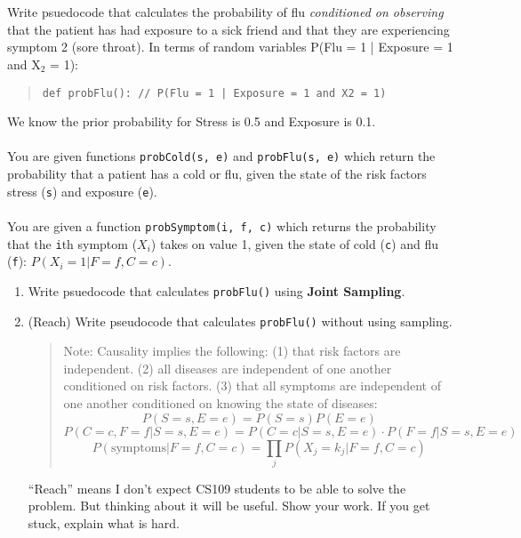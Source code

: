\documentclass[12pt]{article}
\renewcommand{\(}{\left(}
\renewcommand{\)}{\right)}
\theoremstyle{definition}
\begin{document}
\begin{enumerate}
{
    \\ \\
    Write psuedocode that calculates the probability of flu \textit{conditioned on observing} that the patient has had exposure to a sick friend and that they are experiencing symptom 2 (sore throat). In terms of random variables P(Flu = 1 | Exposure = 1 and X$_2$ = 1):
    \begin{quote}
        \texttt{def probFlu(): // P(Flu = 1 | Exposure = 1 and X2 = 1)}
    \end{quote}
    We know the prior probability for Stress is 0.5 and Exposure is 0.1.\\ \\
    You are given functions \texttt{probCold(s, e)} and \texttt{probFlu(s, e)} which return the probability that a patient has a cold or flu, given the state of the risk factors stress (\texttt{s}) and exposure (\texttt{e}).\\ \\
    You are given a function \texttt{probSymptom(i, f, c)} which returns the probability that the \texttt{i}th symptom ($X_i$) takes on value 1, given the state of cold (\texttt{c}) and flu (\texttt{f}): $P(X_i = 1|F = f,C = c)$.
    
    \begin{enumerate}
        \item Write psuedocode that calculates \texttt{probFlu()} using \textbf{Joint Sampling}.
        \item (Reach) Write pseudocode that calculates \texttt{probFlu()} without using sampling.
        \begin{quote}
            Note: Causality implies the following: (1) that risk factors are independent. (2) all diseases are independent of one another conditioned on risk factors. (3) that all symptoms are independent of one another conditioned on knowing the state of diseases:
            \small{
            \begin{equation}
                P(S = s, E = e) = P(S = s)P(E = e)
            \end{equation}
            \begin{equation}
                P(C = c, F = f |S = s, E = e) = P(C = c|S = s, E = e) \cdot P(F = f |S = s, E = e)
            \end{equation}
            \begin{equation}
                P(\text{symptoms}|F = f,C = c) = \prod_j P(X_j = k_j|F = f,C = c)
            \end{equation}
            }
        \end{quote}
        ``Reach'' means I don't expect CS109 students to be able to solve the problem. But thinking about it will be useful. Show your work. If you get stuck, explain what is hard.
    \end{enumerate}
    
}
\end{enumerate}
\end{document}

